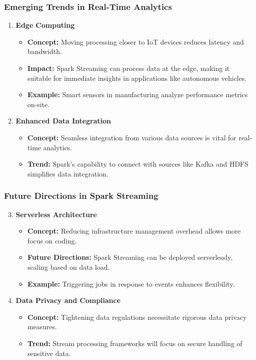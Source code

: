 \documentclass[aspectratio=169]{beamer}
\begin{document}
\begin{frame}[fragile]
    \frametitle{Emerging Trends in Real-Time Analytics}
    \begin{enumerate}
        \item \textbf{Edge Computing}
            \begin{itemize}
                \item \textbf{Concept:} Moving processing closer to IoT devices reduces latency and bandwidth.
                \item \textbf{Impact:} Spark Streaming can process data at the edge, making it suitable for immediate insights in applications like autonomous vehicles.
                \item \textbf{Example:} Smart sensors in manufacturing analyze performance metrics on-site.
            \end{itemize}
        
        \item \textbf{Enhanced Data Integration}
            \begin{itemize}
                \item \textbf{Concept:} Seamless integration from various data sources is vital for real-time analytics.
                \item \textbf{Trend:} Spark's capability to connect with sources like Kafka and HDFS simplifies data integration.
            \end{itemize}
    \end{enumerate}
\end{frame}

\begin{frame}[fragile]
    \frametitle{Future Directions in Spark Streaming}
    \begin{enumerate}
        \setcounter{enumi}{2}
        \item \textbf{Serverless Architecture}
            \begin{itemize}
                \item \textbf{Concept:} Reducing infrastructure management overhead allows more focus on coding.
                \item \textbf{Future Directions:} Spark Streaming can be deployed serverlessly, scaling based on data load.
                \item \textbf{Example:} Triggering jobs in response to events enhances flexibility.
            \end{itemize}

        \item \textbf{Data Privacy and Compliance}
            \begin{itemize}
                \item \textbf{Concept:} Tightening data regulations necessitate rigorous data privacy measures.
                \item \textbf{Trend:} Stream processing frameworks will focus on secure handling of sensitive data.
            \end{itemize}
    \end{enumerate}
\end{frame}
\end{document}
